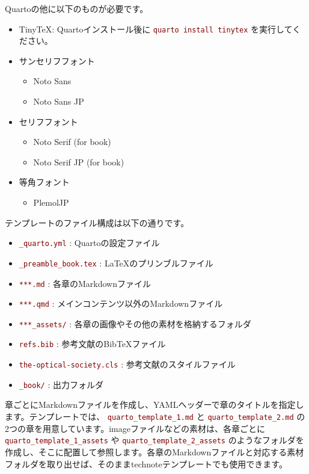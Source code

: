 \documentclass[
  japanese,
  letterpaper,
  lualatex,
  ja=standard,
  10pt,
  a4paper,
  textwidth-limit=50,
  openany]{bxjsbook}
\providecommand{\tightlist}{%
  \setlength{\itemsep}{0pt}\setlength{\parskip}{0pt}}
\let\oldtexttt\texttt
\renewcommand{\texttt}[1]{  %
  \colorbox{codebg}{  %
    \textcolor{Maroon}{  %
      \small  %
      \oldtexttt{#1}
    }
  }
}
\begin{document}
Quartoの他に以下のものが必要です。

\begin{itemize}
\tightlist
\item
  TinyTeX:
  Quartoインストール後に\texttt{quarto\ install\ tinytex}を実行してください。
\item
  サンセリフフォント

  \begin{itemize}
  \tightlist
  \item
    Noto Sans
  \item
    Noto Sans JP
  \end{itemize}
\item
  セリフフォント

  \begin{itemize}
  \tightlist
  \item
    Noto Serif (for book)
  \item
    Noto Serif JP (for book)
  \end{itemize}
\item
  等角フォント

  \begin{itemize}
  \tightlist
  \item
    PlemolJP
  \end{itemize}
\end{itemize}

テンプレートのファイル構成は以下の通りです。

\begin{itemize}
\tightlist
\item
  \texttt{\_quarto.yml}: Quartoの設定ファイル
\item
  \texttt{\_preamble\_book.tex}: LaTeXのプリンブルファイル
\item
  \texttt{***.md}: 各章のMarkdownファイル
\item
  \texttt{***.qmd}: メインコンテンツ以外のMarkdownファイル
\item
  \texttt{***\_assets/}: 各章の画像やその他の素材を格納するフォルダ
\item
  \texttt{refs.bib}: 参考文献のBibTeXファイル
\item
  \texttt{the-optical-society.cls}: 参考文献のスタイルファイル
\item
  \texttt{\_book/}: 出力フォルダ
\end{itemize}

章ごとにMarkdownファイルを作成し、YAMLヘッダーで章のタイトルを指定します。テンプレートでは、\texttt{quarto\_template\_1.md}と\texttt{quarto\_template\_2.md}の2つの章を用意しています。imageファイルなどの素材は、各章ごとに\texttt{quarto\_template\_1\_assets}や\texttt{quarto\_template\_2\_assets}のようなフォルダを作成し、そこに配置して参照します。各章のMarkdownファイルと対応する素材フォルダを取り出せば、そのままtechnoteテンプレートでも使用できます。
\end{document}
